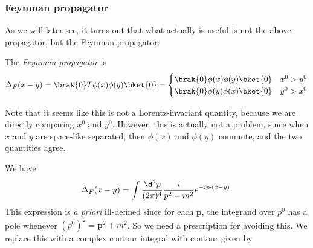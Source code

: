 \documentclass[a4paper]{article}
\begin{document}

\subsubsection*{Feynman propagator}
As we will later see, it turns out that what actually is useful is not the above propagator, but the Feynman propagator:
\begin{defi}
  The \emph{Feynman propagator} is
  \[
    \Delta_F (x - y) = \brak{0} T \phi(x) \phi(y) \bket{0} =
    \begin{cases}
      \brak{0} \phi(x) \phi(y) \bket{0} & x^0 > y^0\\
      \brak{0} \phi(y) \phi(x) \bket{0} & y^0 > x^0
    \end{cases}
  \]
\end{defi}
Note that it seems like this is not a Lorentz-invariant quantity, because we are directly comparing $x^0$ and $y^0$. However, this is actually not a problem, since when $x$ and $y$ are space-like separated, then $\phi(x)$ and $\phi(y)$ commute, and the two quantities agree.

\begin{prop}
  We have
  \[
    \Delta_F(x - y) = \int \frac{\d^4 p}{(2\pi)^4 } \frac{i}{p^2 - m^2} e^{-ip \cdot (x - y)}.
  \]
  This expression is \emph{a priori} ill-defined since for each $\mathbf{p}$, the integrand over $p^0$ has a pole whenever $(p^0)^2 = \mathbf{p}^2 + m^2$. So we need a prescription for avoiding this. We replace this with a complex contour integral with contour given by
  \begin{center}
  \end{center}
\end{prop}
\end{document}
